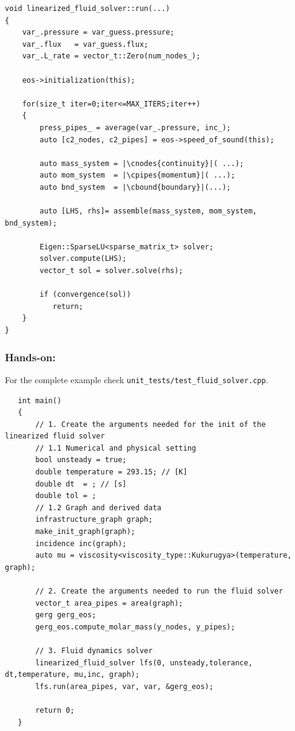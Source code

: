 \begin{verbatim}
void linearized_fluid_solver::run(...)
{
    var_.pressure = var_guess.pressure;
    var_.flux   = var_guess.flux;
    var_.L_rate = vector_t::Zero(num_nodes_);

    eos->initialization(this);

    for(size_t iter=0;iter<=MAX_ITERS;iter++)
    {   
        press_pipes_ = average(var_.pressure, inc_);
        auto [c2_nodes, c2_pipes] = eos->speed_of_sound(this); 

        auto mass_system = |\cnodes{continuity}|( ...);
        auto mom_system  = |\cpipes{momentum}|( ...);
        auto bnd_system  = |\cbound{boundary}|(...);
        
        auto [LHS, rhs]= assemble(mass_system, mom_system, bnd_system);

        Eigen::SparseLU<sparse_matrix_t> solver;
        solver.compute(LHS);
        vector_t sol = solver.solve(rhs);

        if (convergence(sol))
           return;
    }
}
\end{verbatim}

\subsubsection{Hands-on:}
For the complete example check \texttt{unit\_tests/test\_fluid\_solver.cpp}.    

\begin{verbatim}
   int main()
   {
       // 1. Create the arguments needed for the init of the linearized fluid solver
       // 1.1 Numerical and physical setting
       bool unsteady = true;
       double temperature = 293.15; // [K]
       double dt  = ; // [s]
       double tol = ; 
       // 1.2 Graph and derived data
       infrastructure_graph graph;
       make_init_graph(graph);
       incidence inc(graph);
       auto mu = viscosity<viscosity_type::Kukurugya>(temperature, graph); 

       // 2. Create the arguments needed to run the fluid solver
       vector_t area_pipes = area(graph);
       gerg gerg_eos; 
       gerg_eos.compute_molar_mass(y_nodes, y_pipes);
        
       // 3. Fluid dynamics solver
       linearized_fluid_solver lfs(0, unsteady,tolerance, dt,temperature, mu,inc, graph);
       lfs.run(area_pipes, var, var, &gerg_eos);
    
       return 0;
   }
\end{verbatim}

